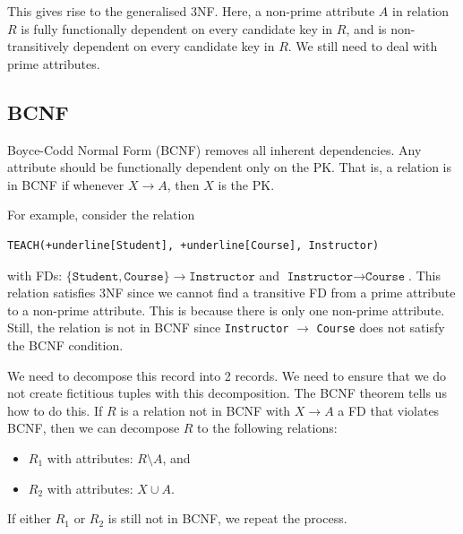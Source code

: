 \documentclass[a4paper, openany]{memoir}
\begin{document}
This gives rise to the generalised 3NF. Here, a non-prime attribute $A$ in relation $R$ is fully functionally dependent on every candidate key in $R$, and is non-transitively dependent on every candidate key in $R$. We still need to deal with prime attributes.

\subsection{BCNF}
Boyce-Codd Normal Form (BCNF) removes all inherent dependencies. Any attribute should be functionally dependent only on the PK. That is, a relation is in BCNF if whenever $X \to A$, then $X$ is the PK.

For example, consider the relation
\begin{Verbatim}[commandchars=+\[\]]
TEACH(+underline[Student], +underline[Course], Instructor)
\end{Verbatim}
with FDs: $\{\texttt{Student}, \texttt{Course}\} \to \texttt{Instructor}$ and $\texttt{Instructor} \to \texttt{Course}$. This relation satisfies 3NF since we cannot find a transitive FD from a prime attribute to a non-prime attribute. This is because there is only one non-prime attribute. Still, the relation is not in BCNF since \texttt{Instructor} $\to$ \texttt{Course} does not satisfy the BCNF condition. 

We need to decompose this record into 2 records. We need to ensure that we do not create fictitious tuples with this decomposition. The BCNF theorem tells us how to do this. If $R$ is a relation not in BCNF with $X \to A$ a FD that violates BCNF, then we can decompose $R$ to the following relations:
\begin{itemize}
    \item $R_1$ with attributes: $R \setminus A$, and
    \item $R_2$ with attributes: $X \cup A$.
\end{itemize}
If either $R_1$ or $R_2$ is still not in BCNF, we repeat the process.
\end{document}
